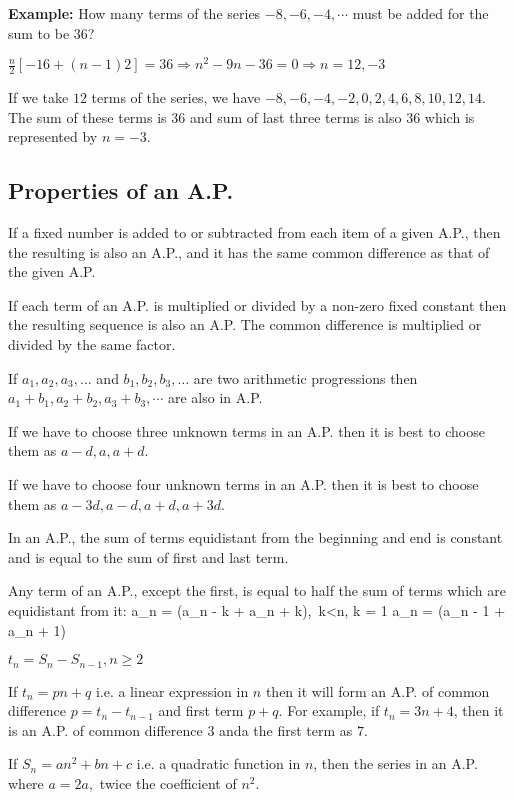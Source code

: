 {\bf Example:} How many terms of the series $-8, -6, -4, \cdots$ must be added for the sum to be $36$?

$\frac{n}{2}[-16 + (n - 1)2] = 36\Rightarrow n^2 - 9n - 36 = 0 \Rightarrow n = 12, -3$

If we take $12$ terms of the series, we have $-8, -6, -4, -2, 0, 2, 4, 6, 8, 10, 12, 14$. The sum of these terms is $36$ and sum of
last three terms is also $36$ which is represented by $n = -3$.

\subsection{Properties of an A.P.}
\startitemize[n]
\item If a fixed number is added to or subtracted from each item of a given A.P., then the resulting is also an A.P., and it has
  the same common difference as that of the given A.P.
\item If each term of an A.P. is multiplied or divided by a non-zero fixed constant then the resulting sequence is also an A.P. The
  common difference is multiplied or divided by the same factor.
\item If $a_1, a_2, a_3, \ldots$ and $b_1, b_2, b_3, \ldots$ are two arithmetic progressions then $a_1 + b_1, a_2 + b_2, a_3 + b_3,
  \cdots$ are also in A.P.
\item If we have to choose three unknown terms in an A.P. then it is best to choose them as $a - d, a, a + d$.
\item If we have to choose four unknown terms in an A.P. then it is best to choose them as $a - 3d, a - d, a + d, a + 3d$.
\item In an A.P., the sum of terms equidistant from the beginning and end is constant and is equal to the sum of first and last
  term.
\item Any term of an A.P., except the first, is equal to half the sum of terms which are equidistant from it:
  \startformula a_n = (a_{n - k} + a_{n + k}), \,k<n, k = 1\stopformula
  \startformula a_n = (a_{n - 1} + a_{n + 1})\stopformula
\item $t_n = S_n - S_{n - 1}, n\geq 2$
\item If $t_n = pn + q$ i.e. a linear expression in $n$ then it will form an A.P. of common difference $p = t_n - t_{n - 1}$ and
  first term $p + q$. For example, if $t_n = 3n + 4$, then it is an A.P. of common difference $3$ anda the first term as $7$.
\item If $S_n = an^2 + bn + c$ i.e. a quadratic function in $n$, then the series in an A.P. where $a = 2a,$ twice the coefficient
  of $n^2$.
\stopitemize

